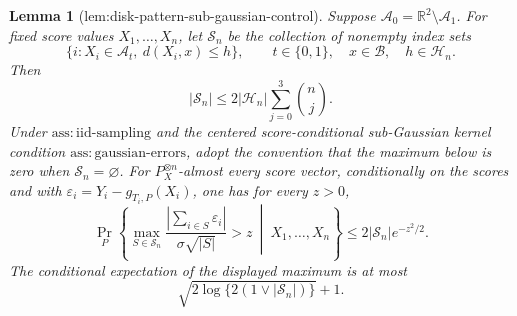\documentclass{article}
\newtheorem{lemma}{Lemma}
\begin{document}
\begin{lemma}[lem:disk-pattern-sub-gaussian-control]\label{lem:disk-pattern-sub-gaussian-control}
Suppose \(\mathcal A_0=\mathbb R^2\setminus\mathcal A_1\). For fixed score values \(X_1,\ldots,X_n\), let \(\mathscr S_n\) be the collection of nonempty index sets
\[
 \{i:X_i\in\mathcal A_t,\ d(X_i,x)\le h\},
 \qquad t\in\{0,1\},\quad x\in\mathcal B,\quad h\in\mathcal H_n.
\]
Then
\[
 |\mathscr S_n|\le 2|\mathcal H_n|\sum_{j=0}^3\binom nj.
\]
Under \(\mathrm{ass:iid\text{-}sampling}\) and the centered score-conditional sub-Gaussian kernel condition \(\mathrm{ass:gaussian\text{-}errors}\), adopt the convention that the maximum below is zero when \(\mathscr S_n=\varnothing\). For \(P_X^{\otimes n}\)-almost every score vector, conditionally on the scores and with \(\varepsilon_i=Y_i-g_{T_i,P}(X_i)\), one has for every \(z>0\),
\[
 \Pr_P\left\{\max_{S\in\mathscr S_n}
 \frac{|\sum_{i\in S}\varepsilon_i|}{\sigma\sqrt{|S|}}>z
 \ \middle|\ X_1,\ldots,X_n\right\}
 \le 2|\mathscr S_n|e^{-z^2/2}.
\]
The conditional expectation of the displayed maximum is at most
\[
 \sqrt{2\log\{2(1\vee|\mathscr S_n|)\}}+1.
\]
\end{lemma}
\end{document}
